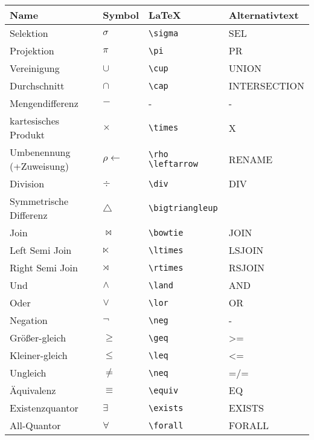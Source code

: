 \documentclass{lehramt-informatik-haupt}
\begin{document}
\begin{tabular}{l|l|l|l}
\textbf{Name} & \textbf{Symbol} & \textbf{LaTeX} & \textbf{Alternativtext}\\\hline\hline
Selektion & $\sigma$ & \verb|\sigma| & SEL\\
Projektion & $\pi$ & \verb|\pi| & PR\\
Vereinigung & $\cup$ & \verb|\cup| & UNION\\
Durchschnitt & $\cap$ & \verb|\cap| & INTERSECTION\\
Mengendifferenz & $-$ & - & -\\
kartesisches Produkt & $\times$ & \verb|\times| & X\\
Umbenennung (+Zuweisung) & $\rho \leftarrow$ & \verb|\rho \leftarrow| & RENAME\\
Division & $\div$ & \verb|\div| & DIV\\

Symmetrische Differenz & $\bigtriangleup$ & \verb|\bigtriangleup| & \\

\hline

Join & $\bowtie$ & \verb|\bowtie| & JOIN\\




Left Semi Join & $\ltimes$ & \verb|\ltimes| & LSJOIN\\

Right Semi Join & $\rtimes$ & \verb|\rtimes| & RSJOIN\\

\hline

Und & $\land$ & \verb|\land| & AND\\

Oder & $\lor$ & \verb|\lor| & OR\\

Negation & $\neg$ & \verb|\neg| & -\\

Größer-gleich & $\geq$ & \verb|\geq| & >=\\

Kleiner-gleich & $\leq$ & \verb|\leq| & <=\\

Ungleich & $\neq$ & \verb|\neq| & =/=\\

Äquivalenz & $\equiv$ & \verb|\equiv| & EQ\\

Existenzquantor & $\exists$ & \verb|\exists| & EXISTS\\

All-Quantor & $\forall$ & \verb|\forall| & FORALL\\
\end{tabular}
\end{document}
